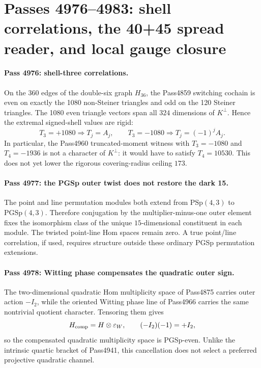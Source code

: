\section*{Passes 4976--4983: shell correlations, the 40+45 spread reader, and local gauge closure}

\paragraph{Pass 4976: shell-three correlations.}
On the 360 edges of the double-six graph $H_{36}$, the Pass4859 switching cochain is even on exactly the
1080 non-Steiner triangles and odd on the 120 Steiner triangles.  The 1080 even triangle vectors span
all $324$ dimensions of $K^\perp$.  Hence the extremal signed-shell values are rigid:
\[
T_3=+1080\Rightarrow T_j=A_j,\qquad
T_3=-1080\Rightarrow T_j=(-1)^jA_j .
\]
In particular, the Pass4960 truncated-moment witness with $T_3=-1080$ and $T_4=-1936$ is not a
character of $K^\perp$: it would have to satisfy $T_4=10530$.  This does not yet lower the rigorous
covering-radius ceiling $173$.

\paragraph{Pass 4977: the PGSp outer twist does not restore the dark 15.}
The point and line permutation modules both extend from $\mathrm{PSp}(4,3)$ to
$\mathrm{PGSp}(4,3)$.  Therefore conjugation by the multiplier-minus-one outer element fixes the
isomorphism class of the unique $15$-dimensional constituent in each module.  The twisted point-line
Hom spaces remain zero.  A true point/line correlation, if used, requires structure outside these
ordinary PGSp permutation extensions.

\paragraph{Pass 4978: Witting phase compensates the quadratic outer sign.}
The two-dimensional quadratic Hom multiplicity space of Pass4875 carries outer action $-I_2$, while
the oriented Witting phase line of Pass4966 carries the same nontrivial quotient character.
Tensoring them gives
\[
H_{\rm comp}=H\otimes\varepsilon_W,\qquad (-I_2)(-1)=+I_2,
\]
so the compensated quadratic multiplicity space is PGSp-even.  Unlike the intrinsic quartic bracket
of Pass4941, this cancellation does not select a preferred projective quadratic channel.


